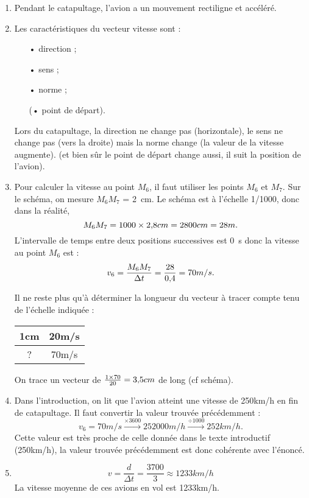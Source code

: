 \documentclass[12pt,a4paper, fleqn]{article}
\begin{document}
\begin{enumerate}[resume]
\item

Pendant le catapultage, l'avion a un mouvement rectiligne et accéléré.

\item Les caractéristiques du vecteur vitesse sont :
\begin{itemize}
\item[•] direction ;
\item[•] sens ;
\item[•] norme ;
\item[(•] point de départ).
\end{itemize}
Lors du catapultage, la direction ne change pas (horizontale), le sens ne change pas (vers la droite) mais la norme change (la valeur de la vitesse augmente). (et bien sûr le point de départ change aussi, il suit la position de l'avion).

\item Pour calculer la vitesse au point $M_6$, il faut utiliser les points $M_6$ et $M_7$.
Sur le schéma, on mesure $M_6 M_7$ =  \unit{2}{cm}.
Le schéma est à l'échelle 1/1000, donc dans la réalité,  
\[
M_6 M_7 = 1000 \times \unit{2\dcoma 8}{cm} = \unit{2800}{cm} = \unit{28}{m}.
\]
L'intervalle de temps entre deux positions successives est \unit{0}{s} donc la vitesse au point $M_6$ est :
\[
v_6 = \frac{M_6 M_7}{\Delta t} = \frac{28}{0\dcoma4} = \unit{70}{m/s}.
\]

Il ne reste plus qu'à déterminer la longueur du vecteur à tracer compte tenu de l'échelle indiquée :
\begin{center}
\begin{tabular}{c|c}
\unit{1}{cm} & \unit{20}{m/s} \\
\hline
? & \unit{70}{m/s}
\end{tabular}
\end{center}

On trace un vecteur de $\frac{1\times 70}{20}=\unit{3\dcoma5}{cm}$ de long (cf schéma).

\item Dans l'introduction, on lit que l'avion atteint une vitesse de \unit{250}{km/h} en fin de catapultage.
Il faut convertir la valeur trouvée précédemment :
\[
v_6 = \unit{70}{m/s} \xrightarrow{\times 3600} \unit{252000}{m/h} \xrightarrow{\div 1000} \unit{252}{km/h}.
\]
Cette valeur est très proche de celle donnée dans le texte introductif (\unit{250}{km/h}), la valeur trouvée précédemment est donc cohérente avec l'énoncé.

\item
\[
v = \frac{d}{\Delta t} = \frac{3700}{3} \approx \unit{1233}{km/h}
\]
La vitesse moyenne de ces avions en vol est \unit{1233}{km/h}.
\end{enumerate}
\end{document}
